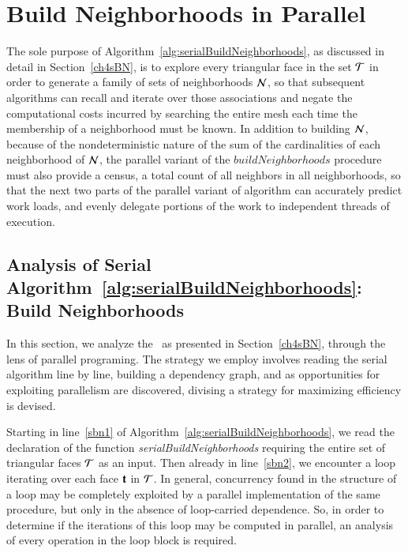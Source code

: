 \section{Build Neighborhoods in Parallel}
\label{ch5sBNP}
The sole purpose of Algorithm~\ref{alg:serialBuildNeighborhoods}, as discussed in detail in Section~\ref{ch4sBN}, is to explore every triangular face in the set $\mathcal{T}$ in order to generate a family of sets of neighborhoods $\mathcal{N}$, so that subsequent algorithms can recall and iterate over those associations and negate the computational costs incurred by searching the entire mesh each time the membership of a neighborhood must be known. In addition to building $\mathcal{N}$, because of the nondeterministic nature of the sum of the cardinalities of each neighborhood of $\mathcal{N}$, the parallel variant of the $\mathit{buildNeighborhoods}$ procedure must also provide a \gls{census}, a total count of all neighbors in all neighborhoods, so that the next two parts of the parallel variant of  algorithm can accurately predict work loads, and evenly delegate portions of the work to independent threads of execution.

%
%
\subsection{Analysis of Serial Algorithm~\ref{alg:serialBuildNeighborhoods}: Build Neighborhoods}
\label{ch5sBNPssASABN}
In this section, we analyze the~ as presented in Section~\ref{ch4sBN}, through the lens of parallel programing. The strategy we employ involves reading the serial algorithm line by line, building a dependency graph, and as opportunities for exploiting parallelism are discovered, divising a strategy for maximizing efficiency is devised.

Starting in line~\ref{sbn1} of Algorithm~\ref{alg:serialBuildNeighborhoods}, we read the declaration of the function \textit{serialBuildNeighborhoods} requiring the entire set of triangular faces $\mathcal{T}$ as an input. Then already in line~\ref{sbn2}, we encounter a loop iterating over each face $\mathbf{t}$ in $\mathcal{T}$. In general, concurrency found in the structure of a loop may be completely exploited by a parallel implementation of the same procedure, but only in the absence of loop-carried dependence. So, in order to determine if the iterations of this loop may be computed in parallel, an analysis of every operation in the loop block is required.

